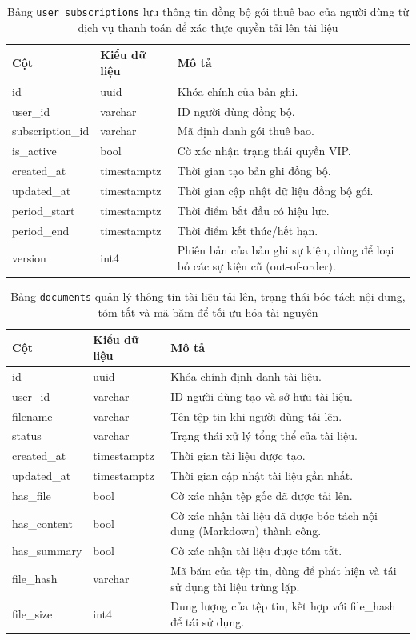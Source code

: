 \begin{table}[H]
\centering
\begin{tabular}{|l|l|p{6cm}|}
\hline
\textbf{Cột} & \textbf{Kiểu dữ liệu} & \textbf{Mô tả} \\ \hline
id & uuid & Khóa chính của bản ghi. \\ \hline
user\_id & varchar & ID người dùng đồng bộ. \\ \hline
subscription\_id & varchar & Mã định danh gói thuê bao. \\ \hline
is\_active & bool & Cờ xác nhận trạng thái quyền VIP. \\ \hline
created\_at & timestamptz & Thời gian tạo bản ghi đồng bộ. \\ \hline
updated\_at & timestamptz & Thời gian cập nhật dữ liệu đồng bộ gói. \\ \hline
period\_start & timestamptz & Thời điểm bắt đầu có hiệu lực. \\ \hline
period\_end & timestamptz & Thời điểm kết thúc/hết hạn. \\ \hline
version & int4 & Phiên bản của bản ghi sự kiện, dùng để loại bỏ các sự kiện cũ (out-of-order). \\ \hline
\end{tabular}
\caption{Bảng \texttt{user\_subscriptions} lưu thông tin đồng bộ gói thuê bao của người dùng từ dịch vụ thanh toán để xác thực quyền tải lên tài liệu}
\end{table}

\begin{table}[H]
\centering
\begin{tabular}{|l|l|p{6cm}|}
\hline
\textbf{Cột} & \textbf{Kiểu dữ liệu} & \textbf{Mô tả} \\ \hline
id & uuid & Khóa chính định danh tài liệu. \\ \hline
user\_id & varchar & ID người dùng tạo và sở hữu tài liệu. \\ \hline
filename & varchar & Tên tệp tin khi người dùng tải lên. \\ \hline
status & varchar & Trạng thái xử lý tổng thể của tài liệu. \\ \hline
created\_at & timestamptz & Thời gian tài liệu được tạo. \\ \hline
updated\_at & timestamptz & Thời gian cập nhật tài liệu gần nhất. \\ \hline
has\_file & bool & Cờ xác nhận tệp gốc đã được tải lên. \\ \hline
has\_content & bool & Cờ xác nhận tài liệu đã được bóc tách nội dung (Markdown) thành công. \\ \hline
has\_summary & bool & Cờ xác nhận tài liệu được tóm tắt. \\ \hline
file\_hash & varchar & Mã băm của tệp tin, dùng để phát hiện và tái sử dụng tài liệu trùng lặp. \\ \hline
file\_size & int4 & Dung lượng của tệp tin, kết hợp với file\_hash để tái sử dụng. \\ \hline
\end{tabular}
\caption{Bảng \texttt{documents} quản lý thông tin tài liệu tải lên, trạng thái bóc tách nội dung, tóm tắt và mã băm để tối ưu hóa tài nguyên}
\end{table}
